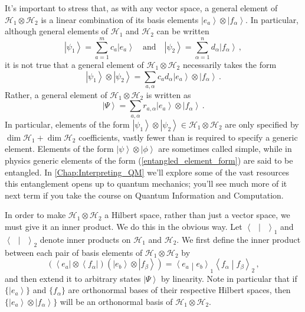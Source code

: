 \documentclass{article}
\theoremstyle{plain}\theoremheaderfont{\normalfont\itshape}\theorembodyfont{\rmfamily}\theoremseparator{.}\newtheorem*{rem}{Remark}\newtheorem*{ex}{Example}\newtheorem*{proof}{Proof}\newtheorem*{altp}{Alternative proof}
\theoremstyle{plain}\theoremheaderfont{\normalfont\bfseries}\theorembodyfont{\rmfamily}\theoremseparator{.}\newtheorem{thm}{Theorem}[section]\newtheorem{lem}[thm]{Lemma}\newtheorem{prop}[thm]{Proposition}\newtheorem*{cor}{Corollary}\newtheorem{defn}[thm]{Definition}\newtheorem{clm}[thm]{Claim}\newtheorem{clminproof}{Claim}
\theoremstyle{break}\theoremheaderfont{\normalfont\itshape}\theorembodyfont{\rmfamily}\theoremseparator{.\medskip}\newtheorem*{proofskip}{Proof}\newtheorem*{exs}{Examples}\newtheorem*{rems}{Remarks}
\theoremstyle{break}\theoremheaderfont{\normalfont\bfseries}\theorembodyfont{\rmfamily}\theoremseparator{.\medskip}\newtheorem{lemskip}[thm]{Lemma}\newtheorem{defnskip}[thm]{Definition}\newtheorem{propskip}[thm]{Proposition}\newtheorem{thmskip}[thm]{Theorem}
\numberwithin{equation}{section}
\newcommand{\bra}[1]{\left\langle #1 \right|}
\newcommand{\ket}[1]{\left| #1 \right\rangle}
\newcommand{\braket}[2]{\left\langle #1 \middle| #2 \right\rangle}
\newcommand{\hb}{\mathcal{H}}
\begin{document}
    It's important to stress that, as with any vector space, a general element of \(\hb_1\otimes\hb_2\) is a linear combination of its basis elements \(\ket{e_a}\otimes\ket{f_\alpha}\). In particular, although general elements of \(\hb_1\) and \(\hb_2\) can be written
    \begin{equation}
        \ket{\psi_1}=\sum_{a=1}^{m}c_a\ket{e_a}\quad\text{and}\quad\ket{\psi_2}=\sum_{\alpha=1}^{n}d_\alpha\ket{f_\alpha}\,,
    \end{equation}
    it is not true that a general element of \(\hb_1\otimes\hb_2\) necessarily takes the form
    \begin{equation}
        \ket{\psi_1}\otimes\ket{\psi_2}=\sum_{a,\alpha}c_ad_\alpha\ket{e_a}\otimes\ket{f_\alpha}\,.
    \end{equation}
    Rather, a general element of \(\hb_1\otimes\hb_2\) is written as
    \begin{equation}\label{entangled_element_form}
        \ket{\Psi}=\sum_{a,\alpha}r_{a,\alpha}\ket{e_a}\otimes\ket{f_\alpha}\,.
    \end{equation}
    In particular, elements of the form \(\ket{\psi_1}\otimes\ket{\psi_2}\in\hb_1\otimes\hb_2\) are only specified by \(\dim\hb_1+\dim\hb_2\) coefficients, vastly fewer than is required to specify a generic element. Elements of the form \(\ket{\psi}\otimes\ket{\phi}\) are sometimes called simple, while in physics generic elements of the form (\ref{entangled_element_form}) are said to be entangled. In \cref{Chap:Interpreting_QM} we'll explore some of the vast resources this entanglement opens up to quantum mechanics; you'll see much more of it next term if you take the course on Quantum Information and Computation.

    In order to make \(\hb_1\otimes\hb_2\) a Hilbert space, rather than just a vector space, we must give it an inner product. We do this in the obvious way. Let \(\braket{\ \ }{\ \ }_1\) and \(\braket{\ \ }{\ \ }_2\) denote inner products on \(\hb_1\) and \(\hb_2\). We first define the inner product between each pair of basis elements of \(\hb_1\otimes\hb_2\) by
    \begin{equation}
        (\bra{e_a}\otimes\bra{f_\alpha})(\ket{e_b}\otimes\ket{f_\beta})=\braket{e_a}{e_b}_1\braket{f_\alpha}{f_\beta}_2\,,
    \end{equation}
    and then extend it to arbitrary states \(\ket{\Psi}\) by linearity. Note in particular that if \(\{\ket{e_a}\}\) and \(\{f_\alpha\}\) are orthonormal bases of their respective Hilbert spaces, then \(\{\ket{e_a}\otimes\ket{f_\alpha}\}\) will be an orthonormal basis of \(\hb_1\otimes\hb_2\).
\end{document}

